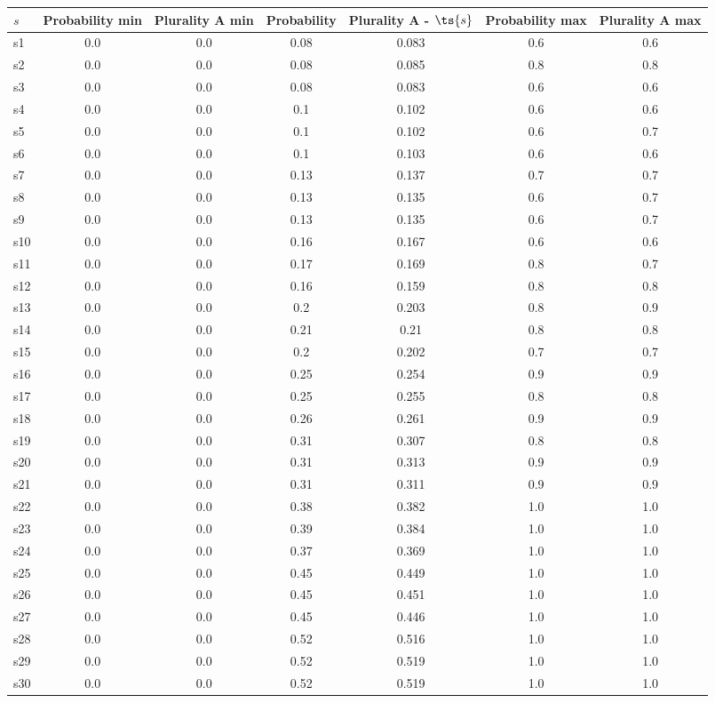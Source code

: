 \documentclass{article}
\begin{document}
\noindent\begin{tabular}{|l|c|c|c|c|c|c|}
\hline
$s$& Probability min & Plurality A min & Probability & Plurality A - $\ts{s}$ & Probability max & Plurality A max\\
\hline
s1 &0.0 & 0.0 & 0.08 & 0.083 & 0.6 & 0.6\\
\hline
s2 &0.0 & 0.0 & 0.08 & 0.085 & 0.8 & 0.8\\
\hline
s3 &0.0 & 0.0 & 0.08 & 0.083 & 0.6 & 0.6\\
\hline
s4 &0.0 & 0.0 & 0.1 & 0.102 & 0.6 & 0.6\\
\hline
s5 &0.0 & 0.0 & 0.1 & 0.102 & 0.6 & 0.7\\
\hline
s6 &0.0 & 0.0 & 0.1 & 0.103 & 0.6 & 0.6\\
\hline
s7 &0.0 & 0.0 & 0.13 & 0.137 & 0.7 & 0.7\\
\hline
s8 &0.0 & 0.0 & 0.13 & 0.135 & 0.6 & 0.7\\
\hline
s9 &0.0 & 0.0 & 0.13 & 0.135 & 0.6 & 0.7\\
\hline
s10 &0.0 & 0.0 & 0.16 & 0.167 & 0.6 & 0.6\\
\hline
s11 &0.0 & 0.0 & 0.17 & 0.169 & 0.8 & 0.7\\
\hline
s12 &0.0 & 0.0 & 0.16 & 0.159 & 0.8 & 0.8\\
\hline
s13 &0.0 & 0.0 & 0.2 & 0.203 & 0.8 & 0.9\\
\hline
s14 &0.0 & 0.0 & 0.21 & 0.21 & 0.8 & 0.8\\
\hline
s15 &0.0 & 0.0 & 0.2 & 0.202 & 0.7 & 0.7\\
\hline
s16 &0.0 & 0.0 & 0.25 & 0.254 & 0.9 & 0.9\\
\hline
s17 &0.0 & 0.0 & 0.25 & 0.255 & 0.8 & 0.8\\
\hline
s18 &0.0 & 0.0 & 0.26 & 0.261 & 0.9 & 0.9\\
\hline
s19 &0.0 & 0.0 & 0.31 & 0.307 & 0.8 & 0.8\\
\hline
s20 &0.0 & 0.0 & 0.31 & 0.313 & 0.9 & 0.9\\
\hline
s21 &0.0 & 0.0 & 0.31 & 0.311 & 0.9 & 0.9\\
\hline
s22 &0.0 & 0.0 & 0.38 & 0.382 & 1.0 & 1.0\\
\hline
s23 &0.0 & 0.0 & 0.39 & 0.384 & 1.0 & 1.0\\
\hline
s24 &0.0 & 0.0 & 0.37 & 0.369 & 1.0 & 1.0\\
\hline
s25 &0.0 & 0.0 & 0.45 & 0.449 & 1.0 & 1.0\\
\hline
s26 &0.0 & 0.0 & 0.45 & 0.451 & 1.0 & 1.0\\
\hline
s27 &0.0 & 0.0 & 0.45 & 0.446 & 1.0 & 1.0\\
\hline
s28 &0.0 & 0.0 & 0.52 & 0.516 & 1.0 & 1.0\\
\hline
s29 &0.0 & 0.0 & 0.52 & 0.519 & 1.0 & 1.0\\
\hline
s30 &0.0 & 0.0 & 0.52 & 0.519 & 1.0 & 1.0\\
\hline
\end{tabular}\\
\end{document}
